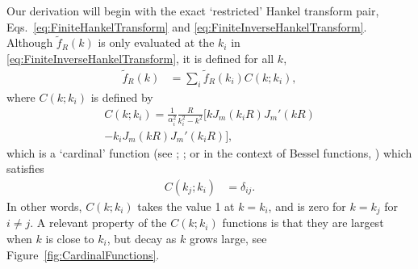 \documentclass[aip,amsmath,amssymb,reprint,twocolumn]{revtex4-1}
\begin{document}
Our derivation will begin with the exact `restricted' Hankel transform pair, Eqs.~\eqref{eq:FiniteHankelTransform} and \eqref{eq:FiniteInverseHankelTransform}.  Although $\tilde{f}_R(k)$ is only evaluated at the $k_i$ in \eqref{eq:FiniteInverseHankelTransform}, it is defined for all $k$,
\begin{align}
  \tilde{f}_R(k) &= \sum_i \tilde{f}_R(k_i) C(k; k_i),
\end{align}
where $C(k; k_i)$ is defined by
\begin{multline}
C(k; k_i) = \frac{1}{\alpha_i^2}\frac{R}{k_i^2 - k^2} \Big[k J_m(k_i R) J_m'(k R) \\ - k_i J_m(k R) J_m'(k_i R) \Big], \label{eq:CardinalFunction}
\end{multline}
which is a `cardinal' function (see \citet{Whittaker:1914}; \citet[Chapter 5]{SpectralMethods}; or in the context of Bessel functions, \citet{Rawn:1989}) which satisfies
\begin{align}
  C(k_j; k_i) &= \delta_{ij}.
\end{align}
In other words, $C(k; k_i)$ takes the value 1 at $k=k_i$, and is zero for $k = k_j$ for $i \neq j$.  A relevant property of the $C(k; k_i)$ functions is that they are largest when $k$ is close to $k_i$, but decay as $k$ grows large, see Figure~\ref{fig:CardinalFunctions}.
\end{document}

